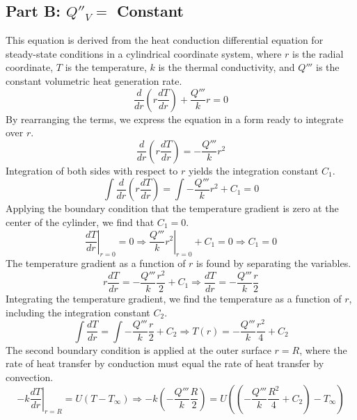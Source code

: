 \documentclass{article}
\numberwithin{equation}{section}
\begin{document}
\subsection*{Part B: \( Q''_V = \) Constant}
This equation is derived from the heat conduction differential equation for steady-state conditions in a cylindrical coordinate system, where \( r \) is the radial coordinate, \( T \) is the temperature, \( k \) is the thermal conductivity, and \( Q''' \) is the constant volumetric heat generation rate.
\begin{equation}
\frac{d}{dr}\left( r\frac{dT}{dr} \right) + \frac{Q'''}{k}r = 0 
\end{equation}
\noindent
By rearranging the terms, we express the equation in a form ready to integrate over \( r \).
\begin{equation}
\frac{d}{dr}\left( r\frac{dT}{dr} \right) = -\frac{Q'''}{k} r^{2}
\end{equation}
\noindent
Integration of both sides with respect to \( r \) yields the integration constant \( C_{1} \).
\begin{equation}
\int \frac{d}{dr}\left( r\frac{dT}{dr} \right) = \int -\frac{Q'''}{k} r^{2} + C_{1} = 0
\end{equation}
\noindent
Applying the boundary condition that the temperature gradient is zero at the center of the cylinder, we find that \( C_{1} = 0 \).
\begin{equation}
\left. \frac{dT}{dr} \right|_{r=0} = 0 \Rightarrow \left. \frac{Q'''}{k} r^{2} \right|_{r=0} + C_{1} = 0 \Rightarrow C_{1} = 0
\end{equation}
\noindent
The temperature gradient as a function of \( r \) is found by separating the variables.
\begin{equation}
r\frac{dT}{dr} = -\frac{Q'''}{k} \frac{r^{2}}{2} + C_{1} \Rightarrow \frac{dT}{dr} = -\frac{Q'''}{k} \frac{r}{2}
\end{equation}
\noindent
Integrating the temperature gradient, we find the temperature as a function of \( r \), including the integration constant \( C_{2} \).
\begin{equation}
\int \frac{dT}{dr} = \int -\frac{Q'''}{k} \frac{r}{2} + C_{2} \Rightarrow T(r) = -\frac{Q'''}{k} \frac{r^{2}}{4} + C_{2}
\end{equation}
\noindent
The second boundary condition is applied at the outer surface \( r = R \), where the rate of heat transfer by conduction must equal the rate of heat transfer by convection.
\begin{equation}
-k \left. \frac{dT}{dr} \right|_{r=R} = U(T - T_{\infty}) \Rightarrow -k\left( -\frac{Q'''}{k} \frac{R}{2} \right) = U\left( \left( -\frac{Q'''}{k} \frac{R^{2}}{4} + C_{2} \right) - T_{\infty} \right)
\end{equation}
\end{document}
